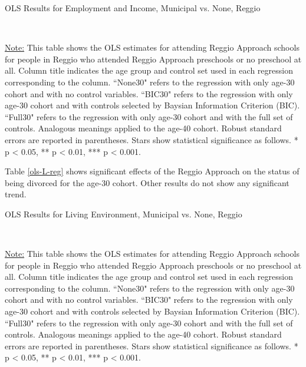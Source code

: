 \begin{table}[H] \caption{OLS Results for Employment and Income, Municipal vs. None, Reggio} \label{ols-W-reg}
\scalebox{0.92}{
}
\vspace{1ex} \\
\footnotesize\raggedright{\underline{Note:} This table shows the OLS estimates for attending Reggio Approach schools for people in Reggio who attended Reggio Approach preschools or no preschool at all. Column title indicates the age group and control set used in each regression corresponding to the column. ``None30" refers to the regression with only age-30 cohort and with no control variables. ``BIC30" refers to the regression with only age-30 cohort and with controls selected by Baysian Information Criterion (BIC). ``Full30" refers to the regression with only age-30 cohort and with the full set of controls. Analogous meanings applied to the age-40 cohort. Robust standard errors are reported in parentheses. Stars show statistical significance as follows. * p < 0.05, ** p < 0.01, *** p < 0.001.}
\end{table}

Table \ref{ols-L-reg} shows significant effects of the Reggio Approach on the status of being divorced for the age-30 cohort. Other results do not show any significant trend. 

\begin{table}[H] \caption{OLS Results for Living Environment, Municipal vs. None, Reggio} \label{ols-L-reg}

\vspace{1ex} \\
\footnotesize\raggedright{\underline{Note:} This table shows the OLS estimates for attending Reggio Approach schools for people in Reggio who attended Reggio Approach preschools or no preschool at all. Column title indicates the age group and control set used in each regression corresponding to the column. ``None30" refers to the regression with only age-30 cohort and with no control variables. ``BIC30" refers to the regression with only age-30 cohort and with controls selected by Baysian Information Criterion (BIC). ``Full30" refers to the regression with only age-30 cohort and with the full set of controls. Analogous meanings applied to the age-40 cohort. Robust standard errors are reported in parentheses. Stars show statistical significance as follows. * p < 0.05, ** p < 0.01, *** p < 0.001.}
\end{table}


